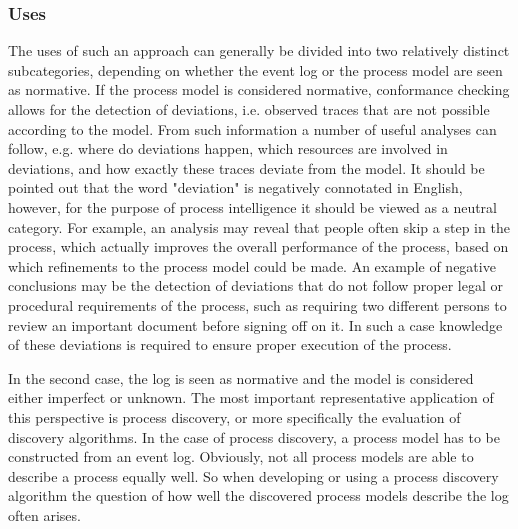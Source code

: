 \documentclass[runningheads]{template/llncs}
\begin{document}
\subsubsection{Uses}
The uses of such an approach can generally be divided into two relatively distinct subcategories, depending on whether the event log or the process model are seen as normative.
If the process model is considered normative, conformance checking allows for the detection of deviations, i.e. observed traces that are not possible according to the model.
From such information a number of useful analyses can follow, e.g. where do deviations happen, which resources are involved in deviations, and how exactly these traces deviate from the model.
It should be pointed out that the word "deviation" is negatively connotated in English, however, for the purpose of process intelligence it should be viewed as a neutral category. 
For example, an analysis may reveal that people often skip a step in the process, which actually improves the overall performance of the process, based on which refinements to the process model could be made.
An example of negative conclusions may be the detection of deviations that do not follow proper legal or procedural requirements of the process, such as requiring two different persons to review an important document before signing off on it. In such a case knowledge of these deviations is required to ensure proper execution of the process.

In the second case, the log is seen as normative and the model is considered either imperfect or unknown.
The most important representative application of this perspective is process discovery, or more specifically the evaluation of discovery algorithms.
In the case of process discovery, a process model has to be constructed from an event log.
Obviously, not all process models are able to describe a process equally well.
So when developing or using a process discovery algorithm the question of how well the discovered process models describe the log often arises.
\end{document}
